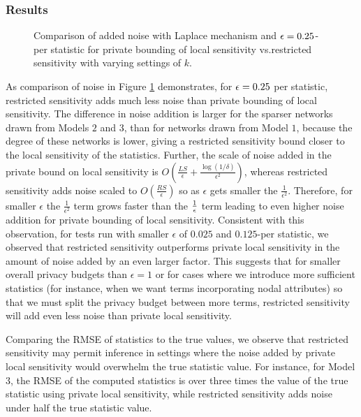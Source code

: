  \subsubsection{Results}
 \begin{figure}[!h]
 	\caption{Comparison of added noise with Laplace mechanism and $\epsilon = 0.25$-per statistic for private bounding of local sensitivity vs.restricted sensitivity with varying settings of $k$.}
 	\label{fig:edge_noise}
 	\centering
 	

 \end{figure}
 
As comparison of noise in Figure \ref{fig:edge_noise} demonstrates, for $\epsilon = 0.25$ per statistic, restricted sensitivity adds much less noise than private bounding of local sensitivity. The difference in noise addition is larger for the sparser networks drawn from Models $2$ and $3$, than for networks drawn from Model $1$, because the degree of these networks is lower, giving a restricted sensitivity bound closer to the local sensitivity of the statistics. Further, the scale of noise added in the private bound on local sensitivity is $O\left(\frac{LS}{\epsilon} + \frac{\log(1/\delta)}{\epsilon^2}\right)$, whereas restricted sensitivity adds noise scaled to $O\left(\frac{RS}{\epsilon}\right)$ so as $\epsilon$ gets smaller the $\frac{1}{\epsilon^2}$. Therefore, for smaller $\epsilon$ the $\frac{1}{\epsilon^2}$ term grows faster than the $\frac{1}{\epsilon}$ term leading to even higher noise addition for private bounding of local sensitivity. Consistent with this observation, for tests run with smaller $\epsilon$ of $0.025$ and $0.125$-per statistic, we observed that restricted sensitivity outperforms private local sensitivity in the amount of noise added by an even larger factor. This suggests that for smaller overall privacy budgets than $\epsilon=1$ or for cases where we introduce more sufficient statistics (for instance, when we want terms incorporating nodal attributes) so that we must split the privacy budget between more terms, restricted sensitivity will add even less noise than private local sensitivity.

Comparing the RMSE of statistics to the true values, we observe that restricted sensitivity may permit inference in settings where the noise added by private local sensitivity would overwhelm the true statistic value. For instance, for Model $3$, the RMSE of the computed statistics is over three times the value of the true statistic using private local sensitivity, while restricted sensitivity adds noise under half the true statistic value. 

